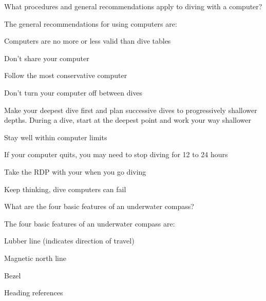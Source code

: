 	\begin{qanda}
		\begin{question}
What procedures and general recommendations apply to diving with a computer?
		\end{question}

		\begin{answer}
The general recommendations for using computers are:
			\begin{nospacenumberedlist}
				\item Computers are no more or less valid than dive tables
				\item Don't share your computer
				\item Follow the most conservative computer
				\item Don't turn your computer off between dives
				\item Make your deepest dive first and plan successive dives to progressively shallower depths.  During a dive, start at the deepest point and work your way shallower
				\item Stay well within computer limits
				\item If your computer quits, you may need to stop diving for 12 to 24 hours
				\item Take the RDP with your when you go diving
				\item Keep thinking, dive computers can fail
			\end{nospacenumberedlist}
		\end{answer}
	\end{qanda}

	\begin{qanda}
		\begin{question}
What are the four basic features of an underwater compass?
		\end{question}

		\begin{answer}
The four basic features of an underwater compass are:
			\begin{nospacenumberedlist}
				\item Lubber line (indicates direction of travel)
				\item Magnetic north line
				\item Bezel
				\item Heading references
			\end{nospacenumberedlist}
		\end{answer}
	\end{qanda}

